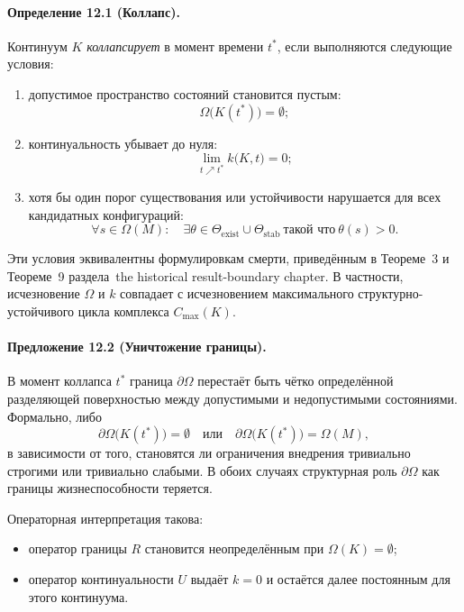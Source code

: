 \paragraph{Определение 12.1 (Коллапс).}
Континуум \(K\) \emph{коллапсирует} в момент времени \(t^{\ast}\), если
выполняются следующие условия:
\begin{enumerate}
  \item допустимое пространство состояний становится пустым:
        \[
          \Omega\big(K(t^{\ast})\big) = \emptyset;
        \]
  \item континуальность убывает до нуля:
        \[
          \lim_{t \nearrow t^{\ast}} k\big(K,t\big) = 0;
        \]
  \item хотя бы один порог существования или устойчивости нарушается для всех
        кандидатных конфигураций:
        \[
          \forall s \in \Omega(M):
          \quad
          \exists \theta \in \Theta_{\mathrm{exist}} \cup \Theta_{\mathrm{stab}}
          \ \text{такой что}\ \theta(s) > 0.
        \]
\end{enumerate}

Эти условия эквивалентны формулировкам смерти, приведённым в
Теореме~3 и Теореме~9 раздела~the historical result-boundary chapter. В частности, исчезновение
\(\Omega\) и \(k\) совпадает с исчезновением максимального структурно-устойчивого
цикла комплекса \(C_{\max}(K)\).

\paragraph{Предложение 12.2 (Уничтожение границы).}
В момент коллапса \(t^{\ast}\) граница \(\partial\Omega\) перестаёт быть
чётко определённой разделяющей поверхностью между допустимыми и
недопустимыми состояниями. Формально, либо
\begin{equation}
  \partial\Omega\big(K(t^{\ast})\big) = \emptyset
  \quad\text{или}\quad
  \partial\Omega\big(K(t^{\ast})\big) = \Omega(M),
\end{equation}
в зависимости от того, становятся ли ограничения внедрения тривиально строгими
или тривиально слабыми. В обоих случаях структурная роль
\(\partial\Omega\) как границы жизнеспособности теряется.

Операторная интерпретация такова:
\begin{itemize}
  \item оператор границы \(R\) становится неопределённым при
        \(\Omega(K)=\emptyset\);
  \item оператор континуальности \(U\) выдаёт \(k=0\) и остаётся далее
        постоянным для этого континуума.
\end{itemize}

